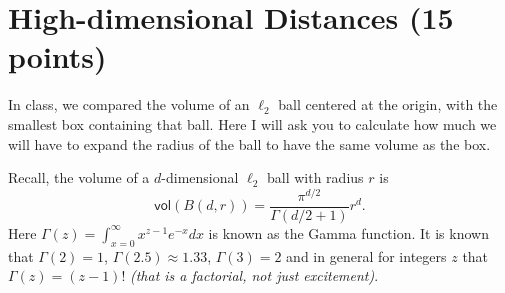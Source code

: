 \documentclass[11pt]{article}
\begin{document}
\section{High-dimensional Distances (15 points)}
In class, we compared the volume of an $\ell_2$ ball centered at the origin, with the smallest box containing that ball.   Here I will ask you to calculate how much we will have to expand the radius of the ball to have the same volume as the box.  

Recall, the volume of a $d$-dimensional $\ell_2$ ball with radius $r$ is
\[
\mathsf{vol}(B(d,r)) = \frac{\pi^{d/2}}{\Gamma(d/2+1)} r^d.
\]
Here $\Gamma(z) = \int_{x = 0}^\infty x^{z-1} e^{-x} dx$ is known as the Gamma function.  It is known that $\Gamma(2) = 1$, $\Gamma(2.5) \approx 1.33$, $\Gamma(3) = 2$ and in general for integers $z$ that $\Gamma(z) = (z-1)!$ \emph{(that is a factorial, not just excitement)}.  
\end{document}
